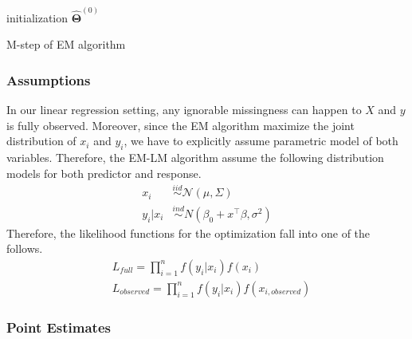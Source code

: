 \documentclass[
  twocolumn]{article}
\begin{document}
\begin{algorithm}
\DontPrintSemicolon
\SetAlgoLined
{}
\BlankLine
initialization $\boldsymbol{\hat{\Theta}}^{(0)}$\;
\caption{M-step of EM algorithm}
\end{algorithm}

\hypertarget{assumptions}{%
\subsubsection{Assumptions}\label{assumptions}}

In our linear regression setting, any ignorable missingness can happen
to \(X\) and \(y\) is fully observed. Moreover, since the EM algorithm
maximize the joint distribution of \(x_i\) and \(y_i\), we have to
explicitly assume parametric model of both variables. Therefore, the
EM-LM algorithm assume the following distribution models for both
predictor and response. \[
\begin{aligned}
x_i &\overset{iid}{\sim} \mathcal{N}(\mu, \Sigma) \\
y_i | x_i &\overset{ind}{\sim} N(\beta_0 + x^{\top}\beta, \sigma^2)
\end{aligned}
\] Therefore, the likelihood functions for the optimization fall into
one of the follows. \[
\begin{aligned}
&L_{full} = \prod_{i = 1}^{n} f(y_i|x_i)f(x_i)\\
&L_{observed} = \prod_{i = 1}^{n} f(y_i|x_i)f(x_{i,observed})
\end{aligned}
\]

\hypertarget{point-estimates}{%
\subsubsection{Point Estimates}\label{point-estimates}}
\end{document}
